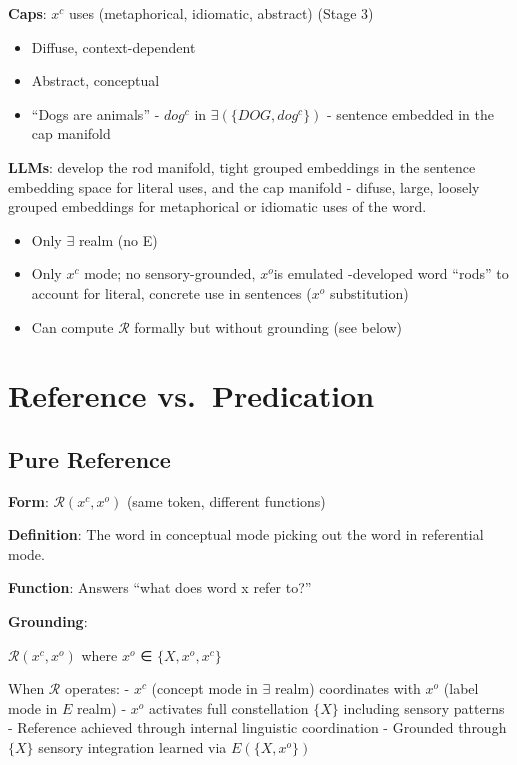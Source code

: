 \documentclass[12pt]{article}
\providecommand{\tightlist}{}   %
\begin{document}
\textbf{Caps}: \(x^c\) uses (metaphorical, idiomatic, abstract) (Stage 3)

\begin{itemize}
\tightlist
\item
  Diffuse, context-dependent
\item
  Abstract, conceptual
\item
  ``Dogs are animals'' - \(dog^c\) in \(\exists(\{DOG, dog^c\})\) - sentence embedded in the cap manifold
\end{itemize}

\textbf{LLMs}: develop the rod manifold, tight grouped embeddings in the sentence embedding space for literal uses, and the cap manifold - difuse, large, loosely grouped embeddings for metaphorical or idiomatic uses of the word.

\begin{itemize}
\tightlist
\item
  Only \(\exists\) realm (no E)
\item
  Only \(x^c\) mode; no sensory-grounded, \(x^o\)is emulated -developed word ``rods'' to account for literal, concrete use in sentences (\(x^o\) substitution)
\item
  Can compute \(\mathcal{R}\) formally but without grounding (see below)
\end{itemize}

\section{Reference vs.~Predication}\label{reference-vs.-predication}

\subsection{Pure Reference}\label{pure-reference}

\textbf{Form}: \(\mathcal{R}(x^c, x^o)\) (same token, different functions)

\textbf{Definition}: The word in conceptual mode picking out the word in referential mode.

\textbf{Function}: Answers ``what does word x refer to?''

\textbf{Grounding}:

\(\mathcal{R}(x^c, x^o)\) where \(x^o\) ∈ \(\{X, x^o, x^c\}\)

When \(\mathcal{R}\) operates: - \(x^c\) (concept mode in \(\exists\) realm) coordinates with \(x^o\) (label mode in \(E\) realm) - \(x^o\) activates full constellation \(\{X\}\) including sensory patterns - Reference achieved through internal linguistic coordination - Grounded through \(\{X\}\) sensory integration learned via \(E(\{X, x^o\})\)
\end{document}
